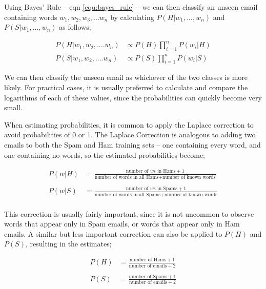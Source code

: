 \documentclass{article}
\begin{document}
    Using Bayes' Rule -- eqn \ref{equ:bayes_rule} -- we can then classify an unseen email containing words $w_1, w_2, w_3,...w_n$ by calculating $P(H|w_1,...,w_n)$ and $P(S|w_1,...,w_n)$ as follows;
    
    \begin{align*}
        P(H|w_1,w_2,....w_n) &\propto P(H)\prod^{n}_{i=1}P(w_i|H) \\
        P(S|w_1,w_2,....w_n) &\propto P(S)\prod^{n}_{i=1}P(w_i|S)
    \end{align*} %

    We can then classify the unseen email as whichever of the two classes is more likely. For practical cases, it is usually preferred to calculate and compare the logarithms of each of these values, since the probabilities can quickly become very small.
    
    When estimating probabilities, it is common to apply the Laplace correction to avoid probabilities of 0 or 1. The Laplace Correction is analogous to adding two emails to both the Spam and Ham training sets -- one containing every word, and one containing no words, so the estimated probabilities become;
    
    \begin{align*}
        P(w | H) &= \frac{\mbox{number of $w$s in Hams} + 1}{\mbox{number of words in all Hams} + \mbox{number of known words}}\\
        &\\
        P(w | S) &= \frac{\mbox{number of $w$s in Spams} + 1}{\mbox{number of words in all Spams} + \mbox{number of known words}}\\
    \end{align*}

    This correction is usually fairly important, since it is not uncommon to observe words that appear only in Spam emails, or words that appear only in Ham emails. A similar but less important correction can also be applied to $P(H)$ and $P(S)$, resulting in the estimates;
    
    \begin{align*}
        P(H) &= \frac{\mbox{number of Hams}+1}{\mbox{number of emails}+2}\\
        & \\
        P(S) &= \frac{\mbox{number of Spams}+1}{\mbox{number of emails}+2}
    \end{align*}
\end{document}

